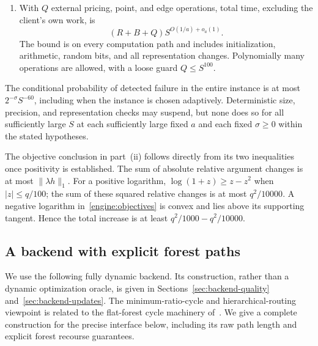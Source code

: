 \begin{lemma}
\begin{enumerate}[label=\textup{(\roman*)}]
coordinates.  Maintaining the representation without taking a step
causes no implicit primal motion.
\item With $Q$ external pricing, point, and edge operations, total time,
excluding the client's own work, is
\begin{equation}\label{engine:time}
                     (R+B+Q)S^{O(1/a)+o_a(1)}.
\end{equation}
The bound is on every computation path and includes initialization,
arithmetic, random bits, and all representation changes.  Polynomially
many operations are allowed, with a loose guard $Q\le S^{100}$.
\end{enumerate}
The conditional probability of detected failure in the entire instance
is at most $2^{-\sigma}S^{-60}$, including when the instance is chosen
adaptively.  Deterministic size, precision, and representation checks may
suspend, but none does so for all sufficiently large $S$ at each
sufficiently large fixed $a$ and each fixed $\sigma\ge0$ within the
stated hypotheses.
\end{lemma}

The objective conclusion in part~\textup{(ii)} follows directly from its
two inequalities once positivity is established.  The sum of absolute
relative argument changes is at most $\|\lambda h\|_1$.  For a positive
logarithm, $\log(1+z)\ge z-z^2$ when $|z|\le q/100$; the sum of these
squared relative changes is at most $q^2/10000$.  A negative logarithm
in~\eqref{engine:objectives} is convex and lies above its supporting
tangent.  Hence the total increase is at least
$q^2/1000-q^2/10000$.

\subsection{A backend with explicit forest paths}\label{engine:backend-interface}

We use the following fully dynamic backend.  Its construction, rather
than a dynamic optimization oracle, is given in
Sections~\ref{sec:backend-quality} and~\ref{sec:backend-updates}.  The
minimum-ratio-cycle and hierarchical-routing viewpoint is related to
the flat-forest cycle machinery of~\cite{IncrementalGraphs}.  We give a
complete construction for the precise interface below, including its
raw path length and explicit forest recourse guarantees.


